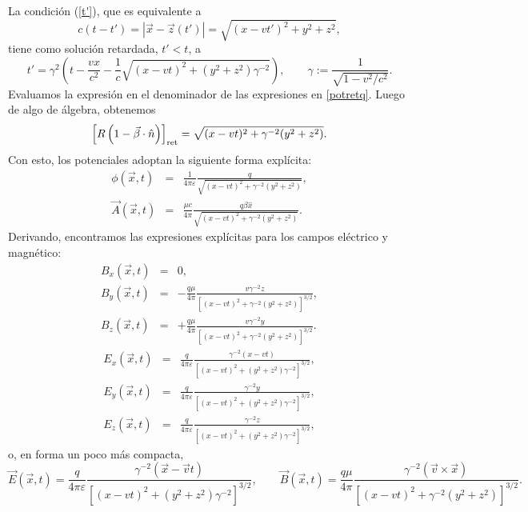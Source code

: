 La condición (\ref{t'}), que es equivalente a
\begin{equation}
c(t-t')=\left|\vec{x}-\vec{z}(t')\right|=\sqrt{(x-vt')^2+y^2+z^2},
\end{equation}
tiene como solución retardada, $t'<t$, a
\begin{equation}
t'=\gamma^2\left( t-\frac{vx}{c^2}-\frac{1}{c}\sqrt{(x-vt)^2+
(y^2+z^2)\gamma^{-2}}\right) , \qquad \gamma:=\frac{1}{\sqrt{1-v^2/c^2}}.
\end{equation}
Evaluamos la expresión en el denominador de las expresiones en \eqref{potretq}. Luego de algo de álgebra, obtenemos
\begin{equation}
\left[ R\left(1-\vec{\beta}\cdot\hat{n}\right)\right]_{\rm ret}=\sqrt{(x-vt)^2+  \gamma^{-2}(y^2+z^2)}.
\end{equation}
Con esto, los potenciales adoptan la siguiente forma explícita:
\begin{eqnarray}
\phi(\vec{x},t)&=&\frac{1}{4\pi\varepsilon}\frac{q}{\sqrt{(x-vt)^2+ \gamma^{-2}(y^2+z^2)}} ,\\
\vec{A}(\vec{x},t)&=&\frac{\mu c}{4\pi} \frac{q\beta\hat{x}}{\sqrt{(x-vt)^2+
\gamma^{-2}(y^2+z^2)}}.
\end{eqnarray}
Derivando, encontramos las expresiones explícitas para los campos eléctrico y magnético:
\begin{eqnarray}
B_x(\vec{x},t)&=&0, \\
B_y(\vec{x},t)&=&-\frac{q\mu}{4\pi}\frac{v\gamma^{-2}z}{\left[ (x-vt)^2+
\gamma^{-2}(y^2+z^2)\right]^{3/2}}, \\
B_z(\vec{x},t)&=&+\frac{q\mu}{4\pi}\frac{v\gamma^{-2}y}{\left[(x-vt)^2+
\gamma^{-2}(y^2+z^2)\right]^{3/2}}.
\end{eqnarray}
\begin{eqnarray}
E_x(\vec{x},t)&=&\frac{q}{4\pi\varepsilon}\frac{\gamma^{-2}\left( x-vt\right) }{\left[ (x-vt)^2+
(y^2+z^2)\gamma^{-2}\right] ^{3/2}}, \\
E_y(\vec{x},t)&=&\frac{q}{4\pi\varepsilon}\frac{\gamma^{-2}y}{\left[ (x-vt)^2+
(y^2+z^2)\gamma^{-2}\right] ^{3/2}},\\
E_z(\vec{x},t)&=&\frac{q}{4\pi\varepsilon}\frac{\gamma^{-2}z }{\left[ (x-vt)^2+
(y^2+z^2)\gamma^{-2}\right]
^{3/2}},
\end{eqnarray}
o, en forma un poco más compacta,
\begin{equation}\label{EBqvconst}
\vec{E}(\vec{x},t)=\frac{q}{4\pi\varepsilon}\frac{\gamma^{-2}\left(\vec{x}-\vec{v}t\right)}{\left[(x-vt)^2+ (y^2+z^2)\gamma^{-2}\right] ^{3/2}},  \qquad
\vec{B}(\vec{x},t)=\frac{q\mu}{4\pi}\frac{\gamma^{-2}(\vec{v}\times\vec{x})}{\left[(x-vt)^2+\gamma^{-2}(y^2+z^2)\right]^{3/2}}.
\end{equation}

